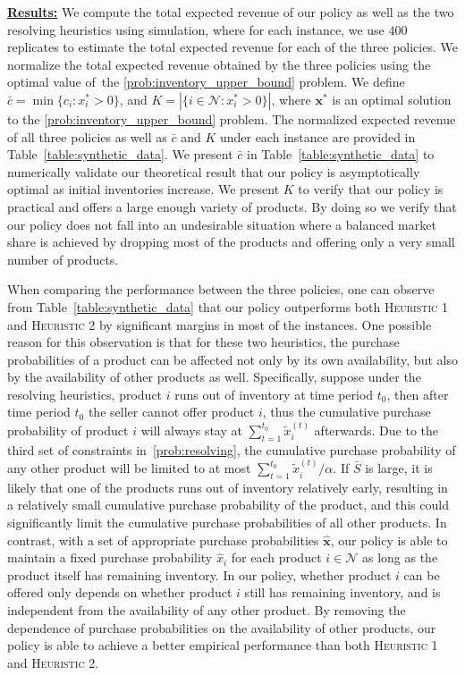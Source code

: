 \documentclass[mnsc,non-blindrev]{informs3}
\theoremstyle{definition}
\begin{document}
\begin{appendices}{\Large{}}
{\noindent\underline{\bf Results:} We compute the total expected revenue of our policy as well as the two resolving heuristics using simulation, where for each instance, we use $400$ replicates to estimate the total expected revenue for each of the three policies. We normalize the total expected revenue obtained by the three policies using the optimal value of~the \ref{prob:inventory_upper_bound} problem. We define $\bar{c}=\min\{c_i:x_i^*>0\}$, and $K=|\{i\in\mathcal{N}:x_i^*>0\}|$, where $\bm{x}^*$ is an optimal solution to the \ref{prob:inventory_upper_bound} problem. The normalized expected revenue of all three policies as well as $\bar{c}$ and $K$ under each instance are provided in Table~\ref{table:synthetic_data}. We present $\bar{c}$ in Table~\ref{table:synthetic_data} to numerically validate our theoretical result that our policy is asymptotically optimal as initial inventories increase. We present $K$ to verify that our policy is practical and offers a large enough variety of products. By doing so we verify that our policy does not fall into an undesirable situation where a balanced market share is achieved by dropping most of the products and offering only a very small number of products.

When comparing the performance between the three policies, one can observe from Table~\ref{table:synthetic_data} that our policy outperforms both \textsc{Heuristic 1} and \textsc{Heuristic 2} by significant margins in most of the instances. One possible reason for this observation is that for these two heuristics, the purchase probabilities of a product can be affected not only by its own availability, but also by the availability of other products as well. Specifically, suppose under the resolving heuristics, product $i$ runs out of inventory at time period $t_0$, then after time period $t_0$ the seller cannot offer product $i$, thus the cumulative purchase probability of product $i$ will always stay at $\sum_{t=1}^{t_0}\tilde{x}_i^{(t)}$ afterwards. Due to the third set of constraints in~\ref{prob:resolving}, the cumulative purchase probability of any other product will be limited to at most $\sum_{t=1}^{t_0}\tilde{x}_i^{(t)}/\alpha$. If $\bar{S}$ is large, it is likely that one of the products runs out of inventory relatively early, resulting in a relatively small cumulative purchase probability of the product, and this could significantly limit the cumulative purchase probabilities of all other products. In contrast, with a set of appropriate purchase probabilities $\hat{\bm{x}}$, our policy is able to maintain a fixed purchase probability $\hat{x}_i$ for each product $i\in\mathcal{N}$ as long as the product itself has remaining inventory. In our policy, whether product $i$ can be offered only depends on whether product $i$ still has remaining inventory, and is independent from the availability of any other product. By removing the dependence of purchase probabilities on the availability of other products, our policy is able to achieve a better empirical performance than both \textsc{Heuristic 1} and \textsc{Heuristic 2}.

}
\end{appendices}
\end{document}
